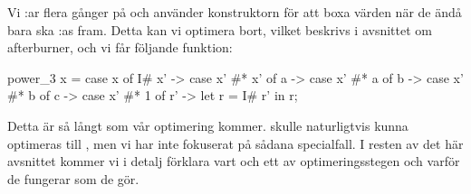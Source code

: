 \documentclass[../Optimise]{subfiles}
\begin{document}
Vi :ar flera gånger på  och använder konstruktorn  för att boxa värden
när de ändå bara ska :as fram.
Detta kan vi optimera bort, vilket beskrivs i avsnittet om afterburner, och vi får följande funktion:

\begin{codeEx}
power_3 x = case x of
    { I# x' -> case x' #* x' of
        { a -> case x' #* a of
            { b -> case x' #* b of
                { c -> case x' #* 1 of
                    { r' -> let r = I# r' in r}}}}};
\end{codeEx}

Detta är så långt som vår optimering kommer.  skulle naturligtvis
kunna optimeras till , men vi har inte fokuserat på sådana specialfall.
I resten av det här avsnittet kommer vi i detalj förklara vart och ett av optimeringsstegen 
och varför de fungerar som de gör.
\end{document}
